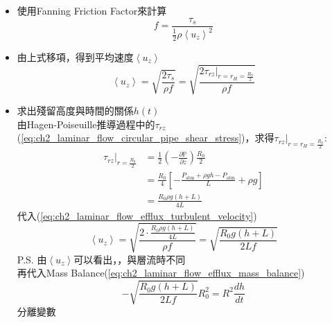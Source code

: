 \documentclass[../main.tex]{subfiles}
\begin{document}
\begin{itemize}
\begin{itemize}
        紊流的整體Shear stress，為$r$為水力半徑時的Shear stress\\
        P.S. 水力半徑為
        \begin{equation}
          r_H = \frac{A}{P} = \frac{\pi R_0^2}{2\pi R_0} = \frac{R_0}{2}
        \end{equation}
      \item 使用Fanning Friction Factor來計算
        \begin{equation}
          f = \frac{\tau_s}{\frac{1}{2}\rho \left<u_z\right>^2}
        \end{equation}
      \item 由上式移項，得到平均速度$\left<u_z\right>$
        \begin{equation}
          \left<u_z\right> = \sqrt{\frac{2\tau_s}{\rho f}} = \sqrt{\frac{2\tau_{rz}\big|_{r=r_H=\frac{R_0}{2}}}{\rho f}} \label{eq:ch2_laminar_flow_efflux_turbulent_velocity}
        \end{equation}
      \item 求出殘留高度與時間的關係$h(t)$\\
        由Hagen-Poiseuille推導過程中的$\tau_{rz}$(\ref{eq:ch2_laminar_flow_circular_pipe_shear_stress})，求得$\tau_{rz}\big|_{r=r_H=\frac{R_0}{2}}$:
        \begin{align}
          \tau_{rz}\big|_{r=\frac{R_0}{2}} &= \frac{1}{2}\left(-\frac{\partial \mathbb P}{\partial z}\right)\frac{R_0}{2} \nonumber\\
          &= \frac{R_0}{4}\left[
            -\frac{P_{\text{atm}}+\rho g h - P_{\text{atm}}}{L} + \rho g
          \right] \nonumber\\
          &= \frac{R_0 \rho g (h+L)}{4L}
        \end{align}
        代入(\ref{eq:ch2_laminar_flow_efflux_turbulent_velocity})
        \begin{equation}
          \left<u_z\right> = \sqrt{\frac{2\cdot \frac{R_0 \rho g (h+L)}{4L}}{\rho f}} = \boxed{\sqrt{\frac{R_0 g (h+L)}{2L f}}}
        \end{equation}
        P.S. 由$\left<u_z\right>$可以看出，，與層流時不同\\
        再代入Mass Balance(\ref{eq:ch2_laminar_flow_efflux_mass_balance})
        \begin{equation}
          -\sqrt{\frac{R_0 g (h+L)}{2L f}} R_0^2 = R^2 \frac{dh}{dt}
        \end{equation}
        分離變數
        \begin{equation}

\end{equation}
\end{itemize}
\end{itemize}
\end{document}
